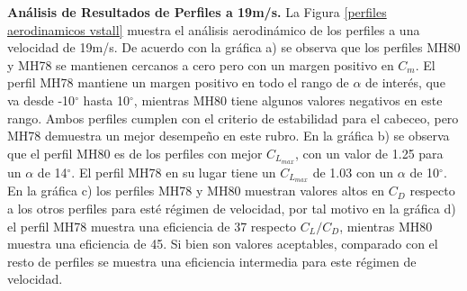 \textbf{Análisis de Resultados de Perfiles a 19m/s.} La Figura \ref{perfiles aerodinamicos vstall} muestra el análisis aerodinámico de los perfiles a una velocidad de 19m/s. De acuerdo con la gráfica a) se observa que los perfiles MH80 y MH78 se mantienen cercanos a cero pero con un margen positivo en $C_m$. El perfil MH78 mantiene un margen positivo en todo el rango de $\alpha$ de interés, que va desde -10$^\circ$ hasta 10$^\circ$, mientras MH80 tiene algunos valores negativos en este rango. Ambos perfiles cumplen con el criterio de estabilidad para el cabeceo, pero MH78 demuestra un mejor desempeño en este rubro. En la gráfica b) se observa que el perfil MH80 es de los perfiles con mejor $C_{L_{max}}$, con un valor de 1.25 para un $\alpha$ de 14$^\circ$. El perfil MH78 en su lugar tiene un $C_{L_{max}}$ de 1.03 con un $\alpha$ de 10$^\circ$. En la gráfica c) los perfiles MH78 y MH80 muestran valores altos en $C_D$ respecto a los otros perfiles para esté régimen de velocidad, por tal motivo en la gráfica d) el perfil MH78 muestra una eficiencia de 37 respecto $C_L/C_D$, mientras MH80 muestra una eficiencia de 45. Si bien son valores aceptables, comparado con el resto de perfiles se muestra una eficiencia intermedia para este régimen de velocidad.  

